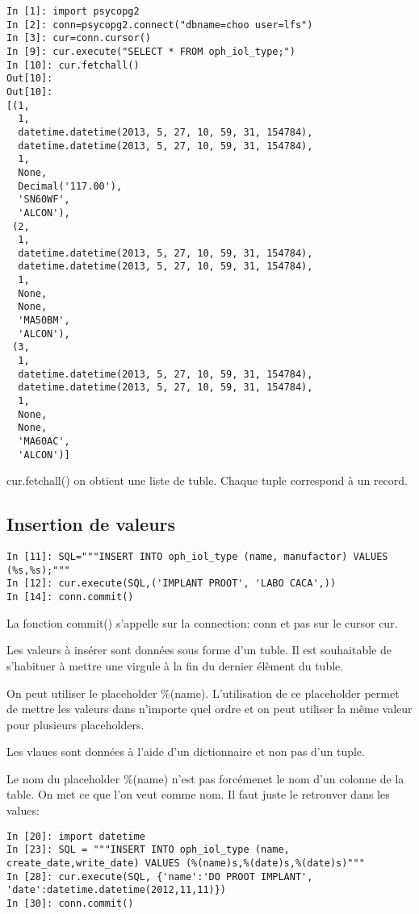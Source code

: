 \documentclass[12pt,a4paper]{article}
\begin{document}
\begin{verbatim}
In [1]: import psycopg2
In [2]: conn=psycopg2.connect("dbname=choo user=lfs")
In [3]: cur=conn.cursor()
In [9]: cur.execute("SELECT * FROM oph_iol_type;")
In [10]: cur.fetchall()
Out[10]: 
Out[10]: 
[(1,
  1,
  datetime.datetime(2013, 5, 27, 10, 59, 31, 154784),
  datetime.datetime(2013, 5, 27, 10, 59, 31, 154784),
  1,
  None,
  Decimal('117.00'),
  'SN60WF',
  'ALCON'),
 (2,
  1,
  datetime.datetime(2013, 5, 27, 10, 59, 31, 154784),
  datetime.datetime(2013, 5, 27, 10, 59, 31, 154784),
  1,
  None,
  None,
  'MA50BM',
  'ALCON'),
 (3,
  1,
  datetime.datetime(2013, 5, 27, 10, 59, 31, 154784),
  datetime.datetime(2013, 5, 27, 10, 59, 31, 154784),
  1,
  None,
  None,
  'MA60AC',
  'ALCON')]
\end{verbatim}

cur.fetchall() on obtient une liste de tuble. Chaque tuple correspond à un record. 


\subsection{Insertion de valeurs}
\label{sec:insertion}


\begin{verbatim}
In [11]: SQL="""INSERT INTO oph_iol_type (name, manufactor) VALUES (%s,%s);"""
In [12]: cur.execute(SQL,('IMPLANT PROOT', 'LABO CACA',))
In [14]: conn.commit()
\end{verbatim}

La fonction commit() s'appelle sur la connection: conn et pas sur le cursor cur.

Les valeurs à insérer sont données sous forme d'un tuble. Il est souhaitable de s'habituer à mettre une virgule à la fin du dernier élèment du tuble. 

On peut utiliser le placeholder \%(name). L'utilisation de ce placeholder permet de mettre les valeurs dans n'importe quel ordre et on peut utiliser la même valeur pour plusieurs placeholders. 

Les vlaues sont données à l'aide d'un dictionnaire et non pas d'un tuple.

Le nom  du placeholder \%(name) n'est pas forcémenet le nom d'un colonne de la table. On met ce que l'on veut comme nom. Il faut juste le retrouver dans les values: 


\begin{verbatim}
In [20]: import datetime
In [23]: SQL = """INSERT INTO oph_iol_type (name, create_date,write_date) VALUES (%(name)s,%(date)s,%(date)s)"""
In [28]: cur.execute(SQL, {'name':'DO PROOT IMPLANT', 'date':datetime.datetime(2012,11,11)})
In [30]: conn.commit()
\end{verbatim}
\end{document}
